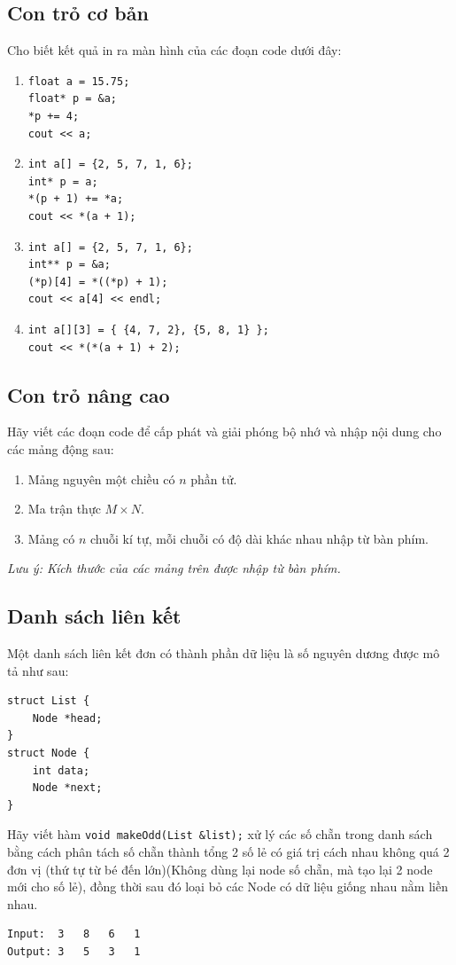 \documentclass[main.tex]{subfiles}
\begin{document}
\subsection{Con trỏ cơ bản}
Cho biết kết quả in ra màn hình của các đoạn code dưới đây:
\begin{enumerate}
    \item \begin{verbatim}
float a = 15.75;
float* p = &a;
*p += 4;
cout << a;
\end{verbatim}
    \item \begin{verbatim}
int a[] = {2, 5, 7, 1, 6};
int* p = a;
*(p + 1) += *a;
cout << *(a + 1);
\end{verbatim}
    \item \begin{verbatim}
int a[] = {2, 5, 7, 1, 6};
int** p = &a;
(*p)[4] = *((*p) + 1);
cout << a[4] << endl;
\end{verbatim}
    \item \begin{verbatim}
int a[][3] = { {4, 7, 2}, {5, 8, 1} };
cout << *(*(a + 1) + 2);
\end{verbatim}
\end{enumerate}
\subsection{Con trỏ nâng cao}
Hãy viết các đoạn code để cấp phát và giải phóng bộ nhớ và nhập nội dung cho các mảng động sau:
\begin{enumerate}[label=\alph*.]
    \item Mảng nguyên một chiều có $n$ phần tử. 
    \item Ma trận thực $M\times N$.
    \item Mảng có $n$ chuỗi kí tự, mỗi chuỗi có độ dài khác nhau nhập từ bàn phím.
\end{enumerate}
\textit{Lưu ý: Kích thước của các mảng trên được nhập từ bàn phím.
}
\subsection{Danh sách liên kết}
Một danh sách liên kết đơn có thành phần dữ liệu là số nguyên dương được mô tả như sau:
\begin{verbatim}
struct List {
    Node *head;
}
struct Node {
    int data;
    Node *next;
}
\end{verbatim}
Hãy viết hàm \texttt{void makeOdd(List &list);} xử lý các số chẵn trong danh sách bằng cách phân tách số chẵn thành tổng 2 số lẻ có giá trị cách nhau không quá 2 đơn vị (thứ tự từ bé đến lớn)(Không dùng lại node số chẵn, mà tạo lại 2 node mới cho số lẻ), đồng thời sau đó loại bỏ các Node có dữ liệu giống nhau nằm liền nhau.
\begin{verbatim}
Input:  3   8   6   1
Output: 3   5   3   1
\end{verbatim}
\end{document}
